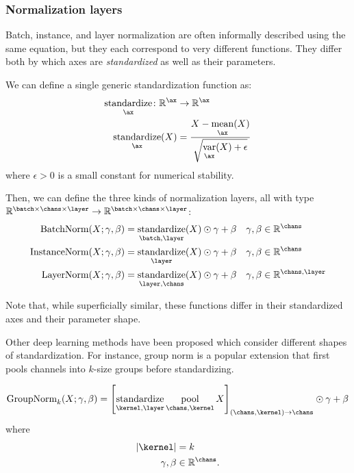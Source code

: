 \documentclass{article}
\newcommand{\reals}{\mathbb{R}}
\begin{document}
\subsubsection{Normalization layers}

Batch, instance, and layer normalization are often informally described using the same
equation, but they each correspond to very different functions. They differ
both by which axes are \textit{standardized} as well as their parameters.

We can define a single generic standardization function as:
\begin{align*}
  \nfun{\ax}{standardize} \colon \mathbb{R}^{\ax} &\rightarrow \mathbb{R}^{\ax} \\
  \nfun{\ax}{standardize}(X) &= \frac{X - \nfun{\ax}{mean}(X)}{\sqrt{\nfun{\ax}{var}(X) + \epsilon}}
\end{align*}
where $\epsilon > 0$ is a small constant for numerical stability.

Then, we can define the three kinds of normalization layers, all with type $\reals^{{\batch \times \chans \times \layer}} \rightarrow \reals^{{\batch \times \chans \times \layer}}$:
\begin{align*}
\text{BatchNorm}(X; \gamma, \beta) &= \nfun{\batch,\layer}{standardize}(X) \ndot{} \gamma + \beta & \gamma, \beta &\in \mathbb{R}^{\chans} \\
\text{InstanceNorm}(X; \gamma, \beta) &= \nfun{\layer}{standardize}(X) \ndot{} \gamma + \beta & \gamma, \beta &\in \mathbb{R}^{\chans} \\
\text{LayerNorm}(X; \gamma, \beta) &= \nfun{\layer,\chans}{standardize}(X) \ndot{} \gamma + \beta & \gamma, \beta &\in \mathbb{R}^{\chans,\layer}
\end{align*}

Note that, while superficially similar, these functions differ in their standardized axes and their parameter shape. 

Other deep learning methods have been proposed which consider different shapes of standardization. For instance, group norm is a popular extension that first pools channels into $k$-size groups before standardizing. 

\begin{align*}
\text{GroupNorm}_k(X; \gamma, \beta) &= \left[ \nfun{\kernel,\layer}{standardize} \nfun{\chans, \kernel}{pool} X \right]_{(\chans,\kernel)\rightarrow \chans } \ndot{} \gamma + \beta \\ 
\end{align*}
where
\begin{align*}
|\kernel| &= k\\
\gamma, \beta &\in \mathbb{R}^{\chans}.
\end{align*}
\end{document}
